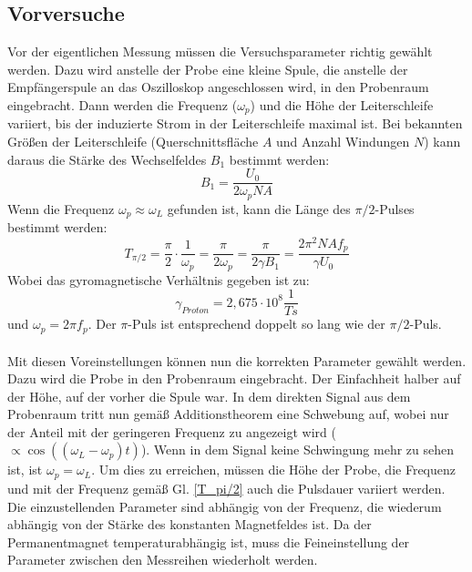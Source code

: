 \documentclass[12pt,a4paper]{article}
\begin{document}
\subsection{Vorversuche}
Vor der eigentlichen Messung müssen die Versuchsparameter richtig gewählt werden. Dazu wird anstelle der Probe eine kleine Spule, die anstelle der Empfängerspule an das Oszilloskop angeschlossen wird, in den Probenraum eingebracht. Dann werden die Frequenz ($\omega _p$) und die Höhe der Leiterschleife variiert, bis der induzierte Strom in der Leiterschleife maximal ist. Bei bekannten Größen der Leiterschleife (Querschnittsfläche $A$ und Anzahl Windungen $N$) kann daraus die Stärke des Wechselfeldes $B_1$ bestimmt werden:
\begin{equation}
\label{B1}
B_1 = \dfrac{U_0}{2 \omega _p N A}
\end{equation}
Wenn die Frequenz $\omega _p \approx \omega _L$ gefunden ist, kann die Länge des $\pi /2$-Pulses bestimmt werden:
\begin{equation}
\label{T_pi/2}
T_{\pi /2} = \dfrac{\pi}{2} \cdot \dfrac{1}{\omega _p} = \dfrac{\pi}{2 \omega _p} = \dfrac{\pi}{2 \gamma B_1} = \dfrac{2 \pi^2 N A f_p}{\gamma U_0}
\end{equation}
Wobei das gyromagnetische Verhältnis gegeben ist zu:
\begin{equation*}
\gamma _{Proton} = 2,675 \cdot 10^{8} \dfrac{1}{T s} 
\end{equation*}
und $\omega_p = 2 \pi f_p$.
Der $\pi$-Puls ist entsprechend doppelt so lang wie der $\pi /2$-Puls.\\
\\
Mit diesen Voreinstellungen können nun die korrekten Parameter gewählt werden. Dazu wird die Probe in den Probenraum eingebracht. Der Einfachheit halber auf der Höhe, auf der vorher die Spule war. In dem direkten Signal aus dem Probenraum tritt nun gemäß Additionstheorem eine Schwebung auf, wobei nur der Anteil mit der geringeren Frequenz zu angezeigt wird ($\propto \cos ((\omega _L - \omega _p) t)$). Wenn in dem Signal keine Schwingung mehr zu sehen ist, ist $\omega _p = \omega _L$. Um dies zu erreichen, müssen die Höhe der Probe, die Frequenz und mit der Frequenz gemäß Gl. \ref{T_pi/2} auch die Pulsdauer variiert werden.\\
Die einzustellenden Parameter sind abhängig von der Frequenz, die wiederum abhängig von der Stärke des konstanten Magnetfeldes ist. Da der Permanentmagnet temperaturabhängig ist, muss die Feineinstellung der Parameter zwischen den Messreihen wiederholt werden.
\end{document}
